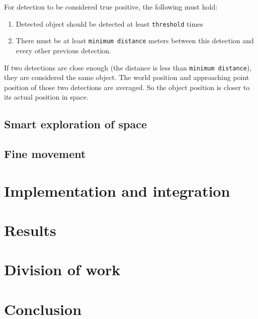 \documentclass[12pt,a4paper]{article}
\begin{document}
	For detection to be considered true positive, the following must hold:
	\begin{enumerate}
		\item Detected object should be detected at least \texttt{threshold} times
		\item There must be at least \texttt{minimum distance} meters between this detection and every other previous detection.
	\end{enumerate}

	If two detections are close enough (the distance is less than \texttt{minimum distance}), they are considered the same object. The world position and approaching point position of those two detections are averaged. So the object position is closer to its actual position in space.
	
	\subsection{Smart exploration of space}
	\subsection{Fine movement}
	
	\section{Implementation and integration}
	
	\section{Results}	
	\section{Division of work}
	
	\section{Conclusion}	
	
\end{document}
